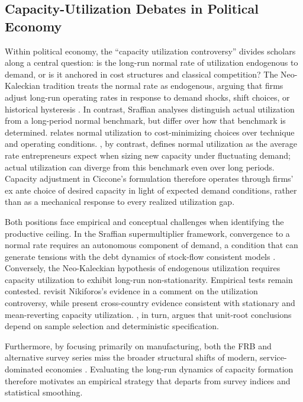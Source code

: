 \subsection{Capacity-Utilization Debates in Political Economy}
\label{subsec:pe_utilization_debates}

Within political economy, the ``capacity utilization controversy'' divides scholars along a central question: is the long-run normal rate of utilization endogenous to demand, or is it anchored in cost structures and classical competition? The Neo-Kaleckian tradition treats the normal rate as endogenous, arguing that firms adjust long-run operating rates in response to demand shocks, shift choices, or historical hysteresis \citep{Lavoie1995, Nikiforos2013, Setterfield2020}. In contrast, Sraffian analyses distinguish actual utilization from a long-period normal benchmark, but differ over how that benchmark is determined. \citet{Kurz1986} relates normal utilization to cost-minimizing choices over technique and operating conditions. \citet{Ciccone1986}, by contrast, defines normal utilization as the average rate entrepreneurs expect when sizing new capacity under fluctuating demand; actual utilization can diverge from this benchmark even over long periods. Capacity adjustment in Ciccone’s formulation therefore operates through firms’ ex ante choice of desired capacity in light of expected demand conditions, rather than as a mechanical response to every realized utilization gap.

Both positions face empirical and conceptual challenges when identifying the productive ceiling. In the Sraffian supermultiplier framework, convergence to a normal rate requires an autonomous component of demand, a condition that can generate tensions with the debt dynamics of stock-flow consistent models \citep{Nikiforos2018}. Conversely, the Neo-Kaleckian hypothesis of endogenous utilization requires capacity utilization to exhibit long-run non-stationarity. Empirical tests remain contested. \citet{GahnGonzalez2020} revisit Nikiforos’s evidence in a comment on the utilization controversy, while \citet{GahnGonzalez2022} present cross-country evidence consistent with stationary and mean-reverting capacity utilization. \citet{Nikiforos2020}, in turn, argues that unit-root conclusions depend on sample selection and deterministic specification.

Furthermore, by focusing primarily on manufacturing, both the FRB and alternative survey series miss the broader structural shifts of modern, service-dominated economies \citep{Haluska2023}. Evaluating the long-run dynamics of capacity formation therefore motivates an empirical strategy that departs from survey indices and statistical smoothing.

